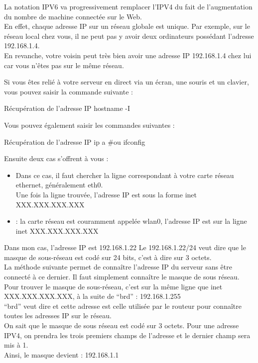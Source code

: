 La notation IPV6 va progressivement remplacer l’IPV4 du fait de l’augmentation du nombre de machine connectée sur le Web. \\

En effet, chaque adresse IP sur un réseau globale est unique. Par exemple, sur le réseau local chez vous, il ne peut pas y avoir deux ordinateurs possédant l’adresse 192.168.1.4. \\

En revanche, votre voisin peut très bien avoir une adresse IP 192.168.1.4 chez lui car vous n'êtes pas sur le même réseau.

Si vous êtes relié à votre serveur en direct via un écran, une souris et un clavier, vous pouvez saisir la commande suivante :   
\begin{Bash}{Récupération de l'adresse IP}
hostname -I
\end{Bash}

Vous pouvez également saisir les commandes suivantes :	

\begin{Bash}{Récupération de l'adresse IP}
ip a
#ou
ifconfig
\end{Bash}


Ensuite deux cas s’offrent à vous : 

\begin{itemize}
    \item {}
    Dans ce cas, il faut chercher la ligne correspondant à votre carte réseau ethernet, généralement eth0. \\
    Une fois la ligne trouvée, l’adresse IP est sous la forme inet XXX.XXX.XXX.XXX

    \item {} : la carte réseau est couramment appelée wlan0, l’adresse IP est sur la ligne inet XXX.XXX.XXX.XXX

\end{itemize}

Dans mon cas, l’adresse IP est 192.168.1.22
Le 192.168.1.22/24 veut dire que le masque de sous-réseau est codé sur 24 bits, c’est à dire sur 3 octets. \\
La méthode suivante permet de connaître l’adresse IP du serveur sans être connecté à ce dernier. Il faut simplement connaître le masque de sous réseau. \\

Pour trouver le masque de sous-réseau, c’est sur la même ligne que inet XXX.XXX.XXX.XXX, à la suite de “brd” : 192.168.1.255 \\
“brd” veut dire  et cette adresse est celle utilisée par le routeur pour connaître toutes les adresses IP sur le réseau. \\
On sait que le masque de sous réseau est codé sur 3 octets. Pour une adresse IPV4, on prendra les trois premiers champs de l’adresse et le dernier champ sera mis à 1. \\
Ainsi, le masque devient : 192.168.1.1

